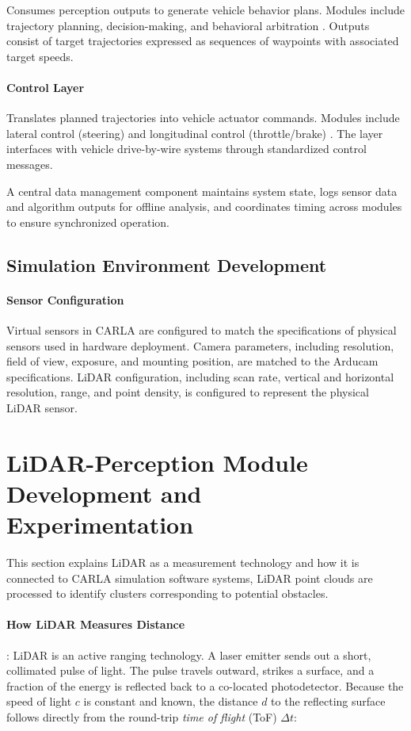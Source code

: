 \documentclass[12pt, a4paper]{report}
\begin{document}
Consumes perception outputs to generate vehicle behavior plans. Modules include trajectory planning, decision-making, and behavioral arbitration \cite{ref3,ref44}. Outputs consist of target trajectories expressed as sequences of waypoints with associated target speeds.

\paragraph{Control Layer}

Translates planned trajectories into vehicle actuator commands. Modules include lateral control (steering) and longitudinal control (throttle/brake) \cite{ref5}. The layer interfaces with vehicle drive-by-wire systems through standardized control messages.

A central data management component maintains system state, logs sensor data and algorithm outputs for offline analysis, and coordinates timing across modules to ensure synchronized operation.

\subsection{Simulation Environment Development}

\paragraph{Sensor Configuration}

Virtual sensors in \ac{CARLA} are configured to match the specifications of physical sensors used in hardware deployment. Camera parameters, including resolution, field of view, exposure, and mounting position, are matched to the Arducam specifications. \ac{LiDAR} configuration, including scan rate, vertical and horizontal resolution, range, and point density, is configured to represent the physical \ac{LiDAR} sensor.

\section{\ac{LiDAR}-Perception Module Development and\\Experimentation}

This section explains \ac{LiDAR} as a measurement technology and how it is connected to CARLA 
simulation software systems, LiDAR point clouds are processed to identify clusters 
corresponding to potential obstacles. \cite{ref4}
\paragraph{How \ac{LiDAR} Measures Distance} :
\ac{LiDAR} is an active ranging technology. A
laser emitter sends out a short, collimated pulse of light. The pulse travels
outward, strikes a surface, and a fraction of the energy is reflected back to a
co-located photodetector. Because the speed of light $c$ is constant and known,
the distance $d$ to the reflecting surface follows directly from the round-trip
\emph{time of flight} (ToF) $\Delta t$:
\end{document}
